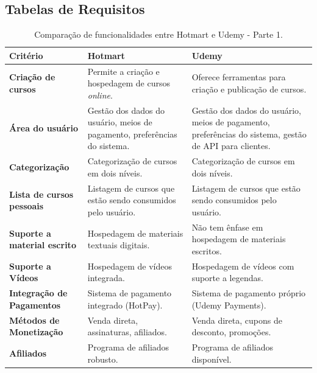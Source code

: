 \begin{apendicesenv}

\partapendices
\chapter{Tabelas de Requisitos}

\begin{table}[h]
    \centering
    \caption{Comparação de funcionalidades entre Hotmart e Udemy - Parte 1.}
    \label{tab:comparacao_hotmart_udemy}
    \begin{adjustbox}{width=\textwidth}
    \begin{tabular}{|p{5cm}|p{5cm}|p{5cm}|}
        \hline
        \textbf{Critério} & \textbf{Hotmart} & \textbf{Udemy} \\
        \hline
        \textbf{Criação de cursos} & Permite a criação e hospedagem de cursos \textit{online}. & Oferece ferramentas para criação e publicação de cursos. \\
        \hline
        \textbf{Área do usuário} & Gestão dos dados do usuário, meios de pagamento, preferências do sistema. & Gestão dos dados do usuário, meios de pagamento, preferências do sistema, gestão de API para clientes. \\
        \hline
        \textbf{Categorização} & Categorização de cursos em dois níveis. & Categorização de cursos em dois níveis. \\
        \hline
        \textbf{Lista de cursos pessoais} & Listagem de cursos que estão sendo consumidos pelo usuário. & Listagem de cursos que estão sendo consumidos pelo usuário. \\
        \hline
        \textbf{Suporte a material escrito} & Hospedagem de materiais textuais digitais. & Não tem ênfase em hospedagem de materiais escritos. \\
        \hline
        \textbf{Suporte a Vídeos} & Hospedagem de vídeos integrada. & Hospedagem de vídeos com suporte a legendas. \\
        \hline
        \textbf{Integração de Pagamentos} & Sistema de pagamento integrado (HotPay). & Sistema de pagamento próprio (Udemy Payments). \\
        \hline
        \textbf{Métodos de Monetização} & Venda direta, assinaturas, afiliados. & Venda direta, cupons de desconto, promoções. \\
        \hline
        \textbf{Afiliados} & Programa de afiliados robusto. & Programa de afiliados disponível. \\

\end{tabular}
\end{adjustbox}
\end{table}
\end{apendicesenv}

